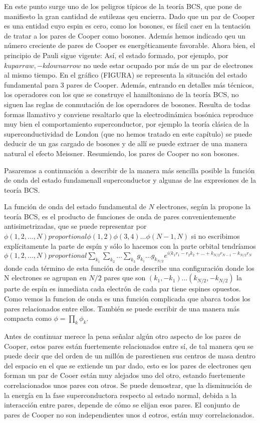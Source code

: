 En este punto surge uno de los peligros típicos de la teoría BCS, que pone de manifiesto la gran cantidad de sutilezas qeu encierra. Dado que un par de Cooper es una entidad cuyo espin es cero, como los bosones, es fácil caer en la tentación de tratar a los pares de Cooper como bosones. Además hemos indicado qeu un número creciente de pares de Cooper es energéticamente favorable. Ahora bien, el principio de Pauli sigue vigente: Así, el estado formado, por ejemplo, por $k uparraw, -k downarrow$ no uede estar ocupado por más de un par de electrones al mismo tiempo. En el gráfico (FIGURA) se representa la situación del estado fundamental para 3 pares de Cooper. Además, entrando en detalles más técnicos, los operadores con los que se construye el hamiltoniano de la teoría BCS, no siguen las reglas de conmutación de los operadores de bosones. Resulta de todas formas llamativo y conviene resaltarlo que la electrodinámica bosónica reproduce muy bien el comportamiento superconductor, por ejemplo la teoría clásica de la superconductividad de London (que no hemos tratado en este capítulo) se puede deducir de un gas cargado de bosones y de allí se puede extraer de una manera natural el efecto Meissner. Resumiendo, los pares de Cooper no son bosones.

Pasaremos a continuación a describir de la manera más sencilla posible la función de onda del estado fundamenall superconductor y algunas de las expresiones de la teoría BCS.

La función de onda del estado fundamental de $N$ electrones, según la propone la teoría BCS, es el producto de funciones de onda de pares convenientemente antisimetrizadas, que se puede representar por $\phi(1,2,...,N) proportional \phi(1,2)\phi(3,4)...\phi(N-1,N)$ si no escribimos explícitamente la parte de espín y sólo lo hacemos con la parte orbital tendríamos $\phi(1,2,...,N) proportional \sum\limits_{k_1} \sum\limits_{k_2} ... \sum\limits_{k_3} g_{k_1} ... g_{k_{N/2}} e^{i (k_1 r_1 - r_2 k_2 + ... + k_{N/2} r_{N-1} - k_{N/2} r_N}$ donde cada término de esta función de onde describe una configuración donde los N electrones se agrupan en $N/2$ pares que son $(k_1, -k_1) ... (k_{N/2}, -k_{N/2})$ la parte de espín es inmediata cada electrón de cada par tiene espines opuestos. Como vemos la funcion de onda es una función complicada que abarca todos los pares relacionados entre ellos. También se puede escribir de una manera más compacta como $\phi = \prod\limits_k \phi_k$.

Antes de continuar merece la pena señalar algún otro aspecto de los pares de Cooper, estos pares están fuertemente relacionados entre sí, de tal manera qeu se puede decir que del orden de un millón de parestienen sus centros de masa dentro del espacio en el que se extiende un par dado, esto es los pares de electrones qeu forman un par de Cooer están muy alejados uno del otro, estando fuertemente correlacionados unos pares con otros. Se puede demostrar, que la disminución de la energía en la fase superconductora respecto al estado normal, debida a la interacción entre pares, depende de cómo se elijan esos pares. El conjunto de pares de Cooper no son independientes unos d eotros, están muy correlacionados.

